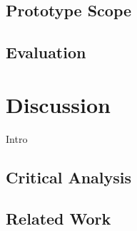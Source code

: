 \documentclass{llncs}
\begin{document}
{		\subsection{Prototype Scope}
			\label{ss:protoype-scope}				
		
		
		\subsection{Evaluation}
			\label{ss:evaluation}				
		


	\section{Discussion}
		\label{section-7}	
		
		Intro

		
		\subsection{Critical Analysis}
			\label{ss:critical-analysis}				
		
		
		\subsection{Related Work}
			\label{ss:competitor-analysis}
			
		
	

}
\end{document}
